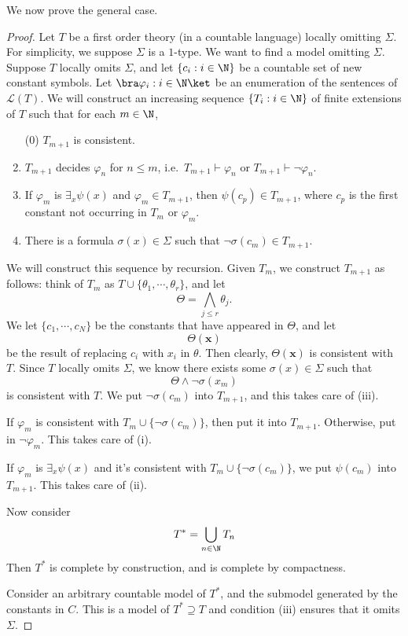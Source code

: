 \documentclass[a4paper]{article}
\begin{document}
We now prove the general case.
\begin{proof}
  Let $T$ be a first order theory (in a countable language) locally omitting $\Sigma$. For simplicity, we suppose $\Sigma$ is a $1$-type. We want to find a model omitting $\Sigma$. Suppose $T$ locally omits $\Sigma$, and let $\{c_i: i \in \N\}$ be a countable set of new constant symbols. Let $\bra \varphi_i: i \in \N\ket$ be an enumeration of the sentences of $\mathcal{L}(T)$. We will construct an increasing sequence $\{ T_i: i \in \N\}$ of finite extensions of $T$ such that for each $m \in \N$,
  \begin{enumerate}
    \item[(0)] $T_{m + 1}$ is consistent.
    \item $T_{m + 1}$ decides $\varphi_n$ for $n \leq m$, i.e.\ $T_{m + 1} \vdash \varphi_n$ or $T_{m + 1} \vdash \neg \varphi_n$.
    \item If $\varphi_m$ is $\exists_x \psi(x)$ and $\varphi_m \in T_{m + 1}$, then $\psi(c_p) \in T_{m + 1}$, where $c_p$ is the first constant not occurring in $T_m$ or $\varphi_m$.
    \item There is a formula $\sigma(x) \in \Sigma$ such that $\neg \sigma(c_m) \in T_{m + 1}$.
  \end{enumerate}
  We will construct this sequence by recursion. Given $T_m$, we construct $T_{m + 1}$ as follows: think of $T_m$ as $T \cup \{\theta_1, \cdots, \theta_r\}$, and let
  \[
    \Theta = \bigwedge_{j \leq r} \theta_j.
  \]
  We let $\{c_1, \cdots, c_N\}$ be the constants that have appeared in $\Theta$, and let
  \[
    \Theta(\mathbf{x})
  \]
  be the result of replacing $c_i$ with $x_i$ in $\theta$. Then clearly, $\Theta(\mathbf{x})$ is consistent with $T$. Since $T$ locally omits $\Sigma$, we know there exists some $\sigma(x) \in \Sigma$ such that
  \[
    \Theta \wedge \neg \sigma(x_m)
  \]
  is consistent with $T$. We put $\neg \sigma(c_m)$ into $T_{m + 1}$, and this takes care of (iii).

  If $\varphi_m$ is consistent with $T_m \cup \{\neg \sigma(c_m)\}$, then put it into $T_{m + 1}$. Otherwise, put in $\neg \varphi_m$. This takes care of (i).

  If $\varphi_m$ is $\exists_x \psi(x)$ and it's consistent with $T_m \cup \{\neg \sigma(c_m)\}$, we put $\psi(c_m)$ into $T_{m + 1}$. This takes care of (ii).

  Now consider
  \[
    T^* = \bigcup_{n \in \N} T_n
  \]
  Then $T^*$ is complete by construction, and is complete by compactness.

  Consider an arbitrary countable model of $T^*$, and the submodel generated by the constants in $C$. This is a model of $T^* \supseteq T$ and condition (iii) ensures that it omits $\Sigma$.
\end{proof}
\end{document}
